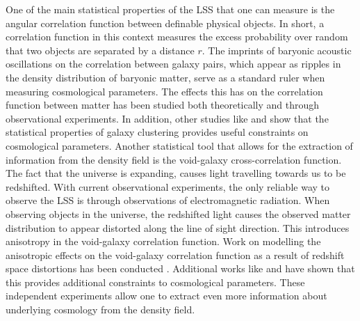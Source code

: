 One of the main statistical properties of the LSS that one can measure is the angular correlation function between definable physical objects. In short, a correlation function in this context measures the excess probability over random that two objects are separated by a distance $r$. The imprints of baryonic acoustic oscillations on the correlation between galaxy pairs\cite{pe00300h}, which appear as ripples in the density distribution of baryonic matter, serve as a standard ruler when measuring cosmological parameters. The effects this has on the correlation function between matter has been studied both theoretically\cite{peebles1980} and through observational experiments\cite{Eisenstein_2005}. In addition, other studies like \cite{refId0} and \cite{Bautista_2020} show that the statistical properties of galaxy clustering provides useful constraints on cosmological parameters. Another statistical tool that allows for the extraction of information from the density field is the void-galaxy cross-correlation function. The fact that the universe is expanding\cite{Hubble168}, causes light travelling towards us to be redshifted. With current observational experiments, the only reliable way to observe the LSS is through observations of electromagnetic radiation. When observing objects in the universe, the redshifted light causes the observed matter distribution to appear distorted along the line of sight direction. This introduces anisotropy in the void-galaxy correlation function. Work on modelling the anisotropic effects on the void-galaxy correlation function as a result of redshift space distortions has been conducted \cite{Nadathur_corr}. Additional works like \cite{BeyondBAO} and \cite{Nadathur_2020} have shown that this provides additional constraints to cosmological parameters. These independent experiments allow one to extract even more information about underlying cosmology from the density field.\\\indent
